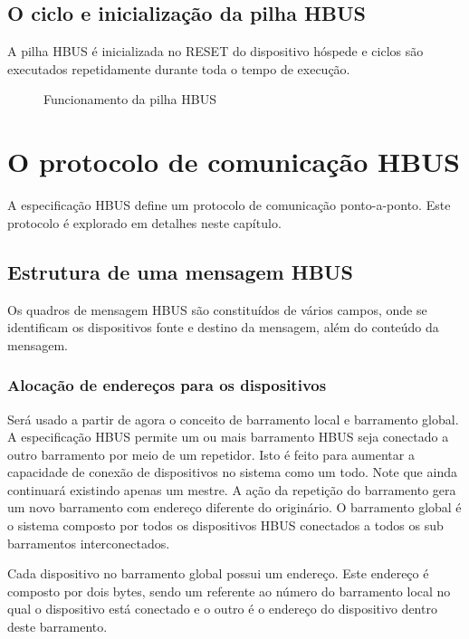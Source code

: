 \documentclass[11pt]{report}
\begin{document}
\section{O ciclo e inicialização da pilha HBUS}

A pilha HBUS é inicializada no RESET do dispositivo hóspede e ciclos são executados repetidamente durante toda o tempo de execução.

\begin{figure}[H]
\centering

\caption{Funcionamento da pilha HBUS}
\end{figure}


\chapter{O protocolo de comunicação HBUS}

A especificação HBUS define um protocolo de comunicação ponto-a-ponto. Este protocolo é explorado em detalhes neste capítulo.

\section{Estrutura de uma mensagem HBUS}

Os quadros de mensagem HBUS são constituídos de vários campos, onde se identificam os dispositivos fonte e destino da mensagem, além do conteúdo da mensagem.

\subsection{Alocação de endereços para os dispositivos}

Será usado a partir de agora o conceito de barramento local e barramento global. A especificação HBUS permite um ou mais barramento HBUS seja conectado a outro barramento por meio de um repetidor. Isto é feito para aumentar a capacidade de conexão de dispositivos no sistema como um todo. Note que ainda continuará existindo apenas um mestre. A ação da repetição do barramento gera um novo barramento com endereço diferente do originário. O barramento global é o sistema composto por todos os dispositivos HBUS conectados a todos os sub barramentos interconectados.

Cada dispositivo no barramento global possui um endereço. Este endereço é composto por dois bytes, sendo um referente ao número do barramento local no qual o dispositivo está conectado e o outro é o endereço do dispositivo dentro deste barramento.
\end{document}
